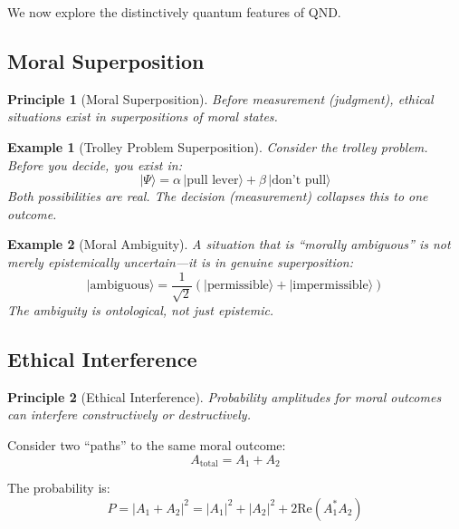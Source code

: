 \documentclass[12pt]{article}
\newtheorem{principle}{Principle}
\newtheorem{example}{Example}[section]
\begin{document}
We now explore the distinctively quantum features of QND.

\subsection{Moral Superposition}

\begin{principle}[Moral Superposition]
\emph{Before measurement (judgment), ethical situations exist in superpositions of moral states.}
\end{principle}

\begin{example}[Trolley Problem Superposition]
Consider the trolley problem. Before you decide, you exist in:
\begin{equation}
    |\Psi\rangle = \alpha \,|\text{pull lever}\rangle + \beta \,|\text{don't pull}\rangle
\end{equation}
Both possibilities are real. The decision (measurement) collapses this to one outcome.
\end{example}

\begin{example}[Moral Ambiguity]
A situation that is ``morally ambiguous'' is not merely epistemically uncertain---it is in genuine superposition:
\begin{equation}
    |\text{ambiguous}\rangle = \frac{1}{\sqrt{2}} \left( |\text{permissible}\rangle + |\text{impermissible}\rangle \right)
\end{equation}
The ambiguity is ontological, not just epistemic.
\end{example}

\subsection{Ethical Interference}

\begin{principle}[Ethical Interference]
\emph{Probability amplitudes for moral outcomes can interfere constructively or destructively.}
\end{principle}

Consider two ``paths'' to the same moral outcome:
\begin{equation}
    A_{\text{total}} = A_1 + A_2
\end{equation}

The probability is:
\begin{equation}
    P = |A_1 + A_2|^2 = |A_1|^2 + |A_2|^2 + 2\mathrm{Re}(A_1^* A_2)
\end{equation}
\end{document}
